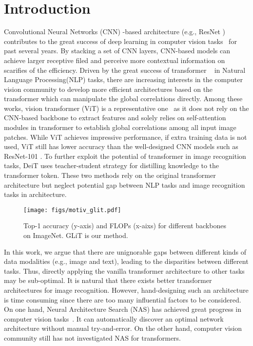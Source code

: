 \documentclass[10pt,twocolumn,letterpaper]{article}
\begin{document}
\section{Introduction}


Convolutional Neural Networks (CNN) -based architecture (e.g., ResNet \cite{resnet-cvpr16}) contributes to the great success of deep learning in computer vision tasks~\cite{ren2015faster, act-chen, gradnet} for past several years. By stacking a set of CNN layers, CNN-based models can  achieve larger receptive filed and perceive more contextual information on scarifies of the efficiency. 
Driven by the great success of transformer ~\cite{trans} in Natural Language Processing(NLP) tasks, there are increasing interests in the computer vision community to develop more efficient architectures based on the transformer \cite{vit_trans,deit,DETR,Defor-Detr} which can manipulate the global correlations directly. Among these works, vision transformer (ViT) is a representative one~\cite{vit_trans} as it does not rely on the CNN-based backbone to extract features and solely relies on self-attention modules in transformer to establish global correlations among all input image patches. While ViT achieves impressive performance, if extra training data is not used, ViT still has lower accuracy than the well-designed CNN models such as ResNet-101 \cite{resnet-cvpr16}. To further exploit the potential of transformer in image recognition tasks, DeiT \cite{deit} uses teacher-student strategy for distilling knowledge to the transformer token. These two methods rely on the original transformer architecture but neglect potential gap between NLP tasks and image recognition tasks in 
 architecture.



\begin{figure}[t]
	\centering
	\texttt{[image: figs/motiv\_glit.pdf]}\\
	\caption{Top-1 accuracy (y-axis) and FLOPs (x-aixs) for different backbones on ImageNet. GLiT is our method.}
	\label{fig:motivation}
    \vspace{-16pt}
\end{figure}




In this work, we argue that there are unignorable gaps between different kinds of data modalities (e.g., image and text), leading to the disparities between different tasks. Thus, directly applying the vanilla transformer architecture to other tasks may be sub-optimal. 
It is natural that there exists better transformer architectures for image recognition. However, hand-designing such an architecture is time consuming since there are too many influential factors to be considered. On one hand, Neural Architecture Search (NAS) has achieved great progress in computer vision tasks~\cite{SPOS-ECCV20-Guo,Darts-ICLR19-Liu,RLnas-ICML17-BelloZVL}. It can automatically discover an optimal network architecture without manual try-and-error. On the other hand, computer vision community still has not investigated NAS for transformers.
 
\end{document}

